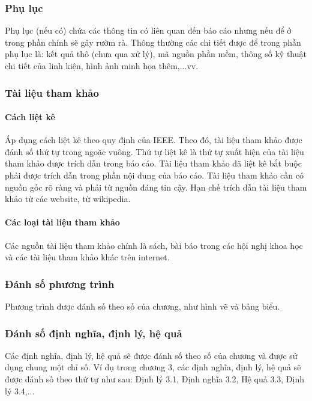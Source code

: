 \documentclass{article} %
\begin{document}
\subsubsection{Phụ lục}
\vspace{-35pt}
Phụ lục (nếu có) chứa các thông tin có liên quan đến báo cáo nhưng nếu để ở trong phần chính sẽ gây rườm rà. Thông
thường các chi tiết được để trong phần phụ lục là: kết quả thô (chưa qua xử lý), mã nguồn phần mềm, thông số kỹ thuật
chi tiết của linh kiện, hình ảnh minh họa thêm,...vv.

\subsubsection{Tài liệu tham khảo}
\vspace{-35pt}
\paragraph{Cách liệt kê}\mbox{}

Áp dụng cách liệt kê theo quy định của IEEE. Theo đó, tài liệu tham khảo được đánh số thứ tự trong ngoặc vuông. Thứ
tự liệt kê là thứ tự xuất hiện của tài liệu tham khảo được trích dẫn trong báo cáo. Tài liệu tham khảo đã liệt kê
bắt buộc phải được trích dẫn trong phần nội dung của báo cáo. Tài liệu tham khảo cần có nguồn gốc rõ ràng và phải
từ nguồn đáng tin cậy. Hạn chế trích dẫn tài liệu tham khảo từ các website, từ wikipedia.
\paragraph{Các loại tài liệu tham khảo}\mbox{}

Các nguồn tài liệu tham khảo chính là sách, bài báo trong các hội nghị khoa học và các tài liệu tham khảo khác trên
internet.

 \subsubsection{Đánh số phương trình}
 \vspace{-30pt}
 Phương trình được đánh số theo số của chương, như hình vẽ và bảng biểu.
 \subsubsection{Đánh số định nghĩa, định lý, hệ quả}
 \vspace{-30pt}
 Các định nghĩa, định lý, hệ quả sẽ được đánh số theo số của chương và được sử dụng chung một chỉ số. Ví dụ trong
 chương 3, các định nghĩa, định lý, hệ quả sẽ được đánh số theo thứ tự như sau: Định lý 3.1, Định nghĩa 3.2, Hệ quả
 3.3, Định lý 3.4,...
\end{document}
